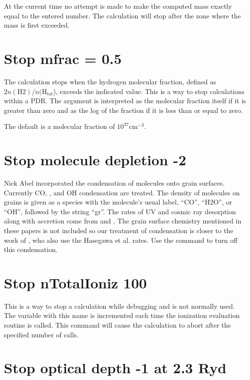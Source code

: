 At the current time no attempt is made to make the computed mass exactly
equal to the entered number.
The calculation will stop after the zone where
the mass is first exceeded.

\section{Stop mfrac = 0.5}

The calculation stops when the hydrogen molecular fraction, defined as
$2n(\mathrm{H}2)/n(\mathrm{H}_{tot}$), exceeds the indicated value.
This is a way to stop
calculations within a PDR.
The argument is interpreted as the molecular
fraction itself if it is greater than zero and as the log of the fraction
if it is less than or equal to zero.

The default is a molecular fraction of $10^{37} \mathrm{cm}^{-3}$.

\section{Stop molecule depletion -2}

Nick Abel incorporated the condensation of molecules onto grain surfaces.
Currently CO, \water, and OH condensation are treated.
The density of molecules
on grains is given as a species with the molecule's usual label, ``CO'',
``H2O'', or ``OH'', followed by the string ``gr''.
The rates of UV and
cosmic ray desorption along with accretion come from \citet{Hasegawa1992} and \citet{Hasegawa1993}.
The grain surface chemistry
mentioned in these papers is not included so our treatment of condensation
is closer to the work of \citet{Bergin1995}, who also use
the Hasegawa et al. rates.
Use the  command
to turn off this condensation.

\section{Stop nTotalIoniz 100}

This is a way to stop a calculation while debugging and is not normally
used.
The variable with this name is incremented each time the ionization
evaluation routine is called.
This command will cause the calculation to
abort after the specified number of calls.

\section{Stop optical depth -1 at 2.3 Ryd}

